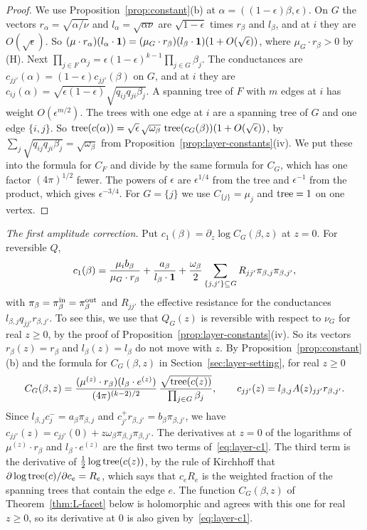 \begin{proof}
We use Proposition~\ref{prop:constant}(b) at $\alpha=((1-\epsilon)\beta,\epsilon)$. On $G$ the
vectors $r_\alpha=\sqrt{\alpha/\nu}$ and $l_\alpha=\sqrt{\alpha\nu}$ are $\sqrt{1-\epsilon}$ times
$r_\beta$ and $l_\beta$, and at $i$ they are $O(\sqrt\epsilon)$. So
$(\mu\cdot r_\alpha)(l_\alpha\cdot\mathbf{1})=(\mu_G\cdot r_\beta)(l_\beta\cdot\mathbf{1})(1+O(\sqrt\epsilon))$,
where $\mu_G\cdot r_\beta>0$ by (H). Next $\prod_{j\in F}\alpha_j=\epsilon(1-\epsilon)^{k-1}\prod_{j\in G}\beta_j$.
The conductances are $c_{jj'}(\alpha)=(1-\epsilon)c_{jj'}(\beta)$ on $G$, and at $i$ they are
$c_{ij}(\alpha)=\sqrt{\epsilon(1-\epsilon)}\sqrt{q_{ij}q_{ji}\beta_j}$. A spanning tree of $F$
with $m$ edges at $i$ has weight $O(\epsilon^{m/2})$. The trees with one edge at $i$ are a
spanning tree of $G$ and one edge $\{i,j\}$. So
$\operatorname{tree}(c(\alpha))=\sqrt\epsilon\,\sqrt{\omega_\beta}\,\operatorname{tree}(c_G(\beta))(1+O(\sqrt\epsilon))$, by
$\sum_j\sqrt{q_{ij}q_{ji}\beta_j}=\sqrt{\omega_\beta}$ from
Proposition~\ref{prop:layer-constants}(iv). We put these into the formula for $C_F$ and divide
by the same formula for $C_G$, which has one factor $(4\pi)^{1/2}$ fewer. The powers of
$\epsilon$ are $\epsilon^{1/4}$ from the tree and $\epsilon^{-1}$ from the product, which gives
$\epsilon^{-3/4}$. For $G=\{j\}$ we use $C_{\{j\}}=\mu_j$ and $\operatorname{tree}=1$ on one vertex.
\end{proof}

\emph{The first amplitude correction.} Put $c_1(\beta)=\partial_z\log C_G(\beta,z)$ at $z=0$.
For reversible $Q$,
\begin{equation}\label{eq:layer-c1}
c_1(\beta)=\frac{\mu_ib_\beta}{\mu_G\cdot r_\beta}+\frac{a_\beta}{l_\beta\cdot\mathbf{1}}+\frac{\omega_\beta}2\sum_{\{j,j'\}\subseteq G}R_{jj'}\pi_{\beta,j}\pi_{\beta,j'},
\end{equation}
with $\pi_\beta=\pi^{\rm in}_\beta=\pi^{\rm out}_\beta$ and $R_{jj'}$ the effective resistance for
the conductances $l_{\beta,j}q_{jj'}r_{\beta,j'}$. To see this, we use that $Q_G(z)$ is
reversible with respect to $\nu_G$ for real $z\ge0$, by the proof of
Proposition~\ref{prop:layer-constants}(iv). So its vectors $r_\beta(z)=r_\beta$ and $l_\beta(z)=l_\beta$ do not move
with $z$. By Proposition~\ref{prop:constant}(b) and the formula for $C_G(\beta,z)$ in
Section~\ref{sec:layer-setting}, for real $z\ge0$
\[
C_G(\beta,z)=\frac{(\mu^{(z)}\cdot r_\beta)(l_\beta\cdot e^{(z)})}{(4\pi)^{(k-2)/2}}\,
\frac{\sqrt{\operatorname{tree}(c(z))}}{\prod_{j\in G}\beta_j},\qquad
c_{jj'}(z)=l_{\beta,j}A(z)_{jj'}r_{\beta,j'} .
\]
Since $l_{\beta,j}c^-_j=a_\beta\pi_{\beta,j}$ and $c^+_{j'}r_{\beta,j'}=b_\beta\pi_{\beta,j'}$, we
have $c_{jj'}(z)=c_{jj'}(0)+z\omega_\beta\pi_{\beta,j}\pi_{\beta,j'}$. The derivatives at $z=0$ of
the logarithms of $\mu^{(z)}\cdot r_\beta$ and $l_\beta\cdot e^{(z)}$ are the first two terms
of~\eqref{eq:layer-c1}. The third term is the derivative of $\frac12\log\operatorname{tree}(c(z))$, by the rule
of Kirchhoff that $\partial\log\operatorname{tree}(c)/\partial c_e=R_e$, which says that $c_eR_e$ is the
weighted fraction of the spanning trees that contain the edge $e$. The function $C_G(\beta,z)$
of Theorem~\ref{thm:L-facet} below is holomorphic and agrees with this one for real $z\ge0$, so
its derivative at $0$ is also given by~\eqref{eq:layer-c1}.

